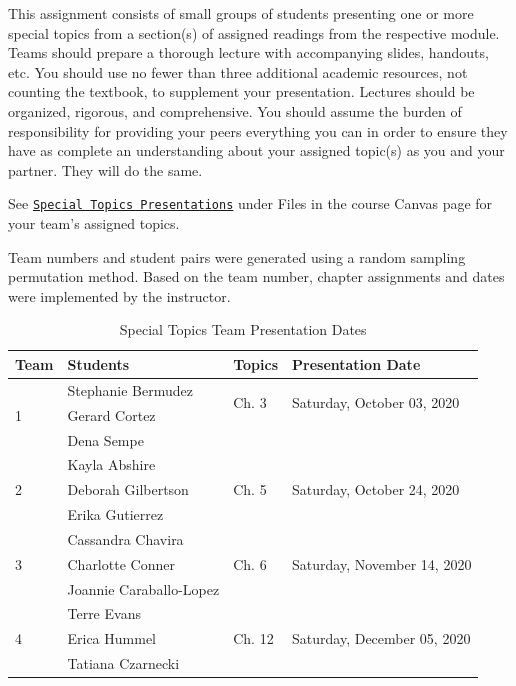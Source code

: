 \documentclass[
]{article}
\begin{document}
This assignment consists of small groups of students presenting one or
more special topics from a section(s) of assigned readings from the
respective module. Teams should prepare a thorough lecture with
accompanying slides, handouts, etc. You should use no fewer than three
additional academic resources, not counting the textbook, to supplement
your presentation. Lectures should be organized, rigorous, and
comprehensive. You should assume the burden of responsibility for
providing your peers everything you can in order to ensure they have as
complete an understanding about your assigned topic(s) as you and your
partner. They will do the same.

See \texttt{\href{https://bit.ly/2EfvCzF}{Special Topics Presentations}}
under Files in the course Canvas page for your team's assigned topics.

Team numbers and student pairs were generated using a random sampling
permutation method. Based on the team number, chapter assignments and
dates were implemented by the instructor.

\begin{table}[H]
\begin{center}
\caption{Special Topics Team Presentation Dates}
\vspace{3mm}
\begin{tabular}{llll}
\hline
\textbf{Team} & \textbf{Students} & \textbf{Topics} & \textbf{Presentation Date} \\
\hline
\multirow{3}{*}{1} & Stephanie Bermudez & \multirow{2}{*}{Ch. 3} & \multirow{2}{*}{Saturday, October 03, 2020} \\
& Gerard Cortez &  &  \\
& Dena Sempe &  &  \\
\hline
\multirow{3}{*}{2} & Kayla Abshire & \multirow{3}{*}{Ch. 5} & \multirow{3}{*}{Saturday, October 24, 2020} \\
& Deborah Gilbertson &  &  \\
& Erika Gutierrez &  &  \\
\hline
\multirow{3}{*}{3} & Cassandra Chavira & \multirow{3}{*}{Ch. 6} & \multirow{3}{*}{Saturday, November 14, 2020} \\
& Charlotte Conner &  & \\
& Joannie Caraballo-Lopez &  & \\
\hline
\multirow{3}{*}{4} & Terre Evans & \multirow{3}{*}{Ch. 12} & \multirow{3}{*}{Saturday, December 05, 2020} \\
& Erica Hummel &  &  \\
& Tatiana Czarnecki &   & \\
\hline
\end{tabular}
\end{center}
\end{table}
\end{document}
